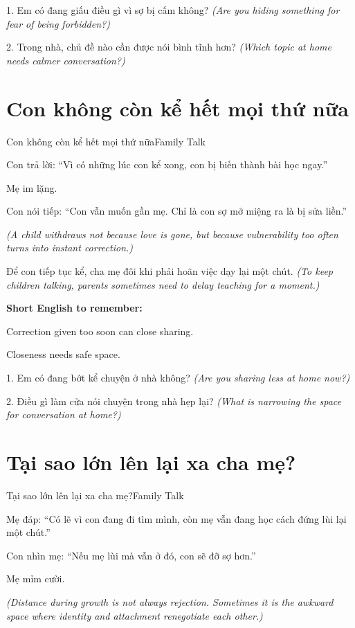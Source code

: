 \begin{tuhocnhanh}
1. Em có đang giấu điều gì vì sợ bị cấm không? \textit{(Are you hiding something for fear of being forbidden?)}

2. Trong nhà, chủ đề nào cần được nói bình tĩnh hơn? \textit{(Which topic at home needs calmer conversation?)}
\end{tuhocnhanh}
\ngancach

\section{Con không còn kể hết mọi thứ nữa}
\begin{truyen}{Con không còn kể hết mọi thứ nữa}{Family Talk}

Con trả lời: ``Vì có những lúc con kể xong, con bị biến thành bài học ngay.''

Mẹ im lặng.

Con nói tiếp: ``Con vẫn muốn gần mẹ. Chỉ là con sợ mở miệng ra là bị sửa liền.''

\textit{(A child withdraws not because love is gone, but because vulnerability too often turns into instant correction.)}
\end{truyen}

\begin{baihoc}
Để con tiếp tục kể, cha mẹ đôi khi phải hoãn việc dạy lại một chút.
\textit{(To keep children talking, parents sometimes need to delay teaching for a moment.)}
\end{baihoc}

\begin{ghinhoanh}
\textbf{Short English to remember:}

Correction given too soon can close sharing.

Closeness needs safe space.
\end{ghinhoanh}

\begin{tuhocnhanh}
1. Em có đang bớt kể chuyện ở nhà không? \textit{(Are you sharing less at home now?)}

2. Điều gì làm cửa nói chuyện trong nhà hẹp lại? \textit{(What is narrowing the space for conversation at home?)}
\end{tuhocnhanh}
\ngancach

\section{Tại sao lớn lên lại xa cha mẹ?}
\begin{truyen}{Tại sao lớn lên lại xa cha mẹ?}{Family Talk}

Mẹ đáp: ``Có lẽ vì con đang đi tìm mình, còn mẹ vẫn đang học cách đứng lùi lại một chút.''

Con nhìn mẹ: ``Nếu mẹ lùi mà vẫn ở đó, con sẽ đỡ sợ hơn.''

Mẹ mỉm cười.

\textit{(Distance during growth is not always rejection. Sometimes it is the awkward space where identity and attachment renegotiate each other.)}
\end{truyen}

